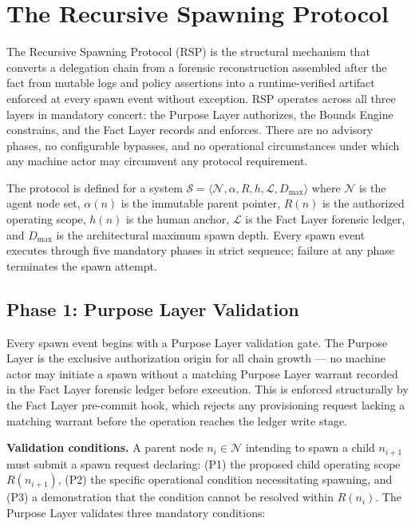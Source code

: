 \section{The Recursive Spawning Protocol}
\label{sec:rs-protocol}

The Recursive Spawning Protocol (RSP) is the structural mechanism that converts a delegation chain from a forensic reconstruction assembled after the fact from mutable logs and policy assertions into a runtime-verified artifact enforced at every spawn event without exception. RSP operates across all three \bxthree{} layers in mandatory concert: the Purpose Layer authorizes, the Bounds Engine constrains, and the Fact Layer records and enforces. There are no advisory phases, no configurable bypasses, and no operational circumstances under which any machine actor may circumvent any protocol requirement.

The protocol is defined for a system $\mathcal{S} = \langle \mathcal{N}, \alpha, R, h, \mathcal{L}, D_{\max} \rangle$ where $\mathcal{N}$ is the agent node set, $\alpha(n)$ is the immutable parent pointer, $R(n)$ is the authorized operating scope, $h(n)$ is the human anchor, $\mathcal{L}$ is the Fact Layer forensic ledger, and $D_{\max}$ is the architectural maximum spawn depth. Every spawn event executes through five mandatory phases in strict sequence; failure at any phase terminates the spawn attempt.

\subsection{Phase 1: Purpose Layer Validation}
\label{sec:rs-phase1}

Every spawn event begins with a Purpose Layer validation gate. The Purpose Layer is the exclusive authorization origin for all chain growth — no machine actor may initiate a spawn without a matching Purpose Layer warrant recorded in the Fact Layer forensic ledger before execution. This is enforced structurally by the Fact Layer pre-commit hook, which rejects any provisioning request lacking a matching warrant before the operation reaches the ledger write stage.

\medskip
\noindent\textbf{Validation conditions.} A parent node $n_i \in \mathcal{N}$ intending to spawn a child $n_{i+1}$ must submit a spawn request declaring: (P1) the proposed child operating scope $R(n_{i+1})$, (P2) the specific operational condition necessitating spawning, and (P3) a demonstration that the condition cannot be resolved within $R(n_i)$. The Purpose Layer validates three mandatory conditions:

